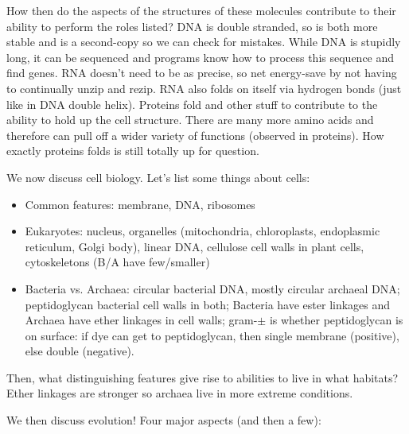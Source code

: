 \documentclass[12pt]{article}
\begin{document}
How then do the aspects of the structures of these molecules contribute to their ability to perform the roles listed? DNA is double stranded, so is both more stable and is a second-copy so we can check for mistakes. While DNA is stupidly long, it can be sequenced and programs know how to process this sequence and find genes. RNA doesn't need to be as precise, so net energy-save by not having to continually unzip and rezip. RNA also folds on itself via hydrogen bonds (just like in DNA double helix). Proteins fold and other stuff to contribute to the ability to hold up the cell structure. There are many more amino acids and therefore can pull off a wider variety of functions (observed in proteins). How exactly proteins folds is still totally up for question.

We now discuss cell biology. Let's list some things about cells:

\begin{itemize}
	\item Common features: membrane, DNA, ribosomes
	\item Eukaryotes: nucleus, organelles (mitochondria, chloroplasts, endoplasmic reticulum, Golgi body), linear DNA, cellulose cell walls in plant cells, cytoskeletons (B/A have few/smaller)
	\item Bacteria vs. Archaea: circular bacterial DNA, mostly circular archaeal DNA; peptidoglycan bacterial cell walls in both; Bacteria have ester linkages and Archaea have ether linkages in cell walls; gram-$\pm$ is whether peptidoglycan is on surface: if dye can get to peptidoglycan, then single membrane (positive), else double (negative). 
\end{itemize}

Then, what distinguishing features give rise to abilities to live in what habitats? Ether linkages are stronger so archaea live in more extreme conditions. 

We then discuss evolution! Four major aspects (and then a few):
\end{document}
